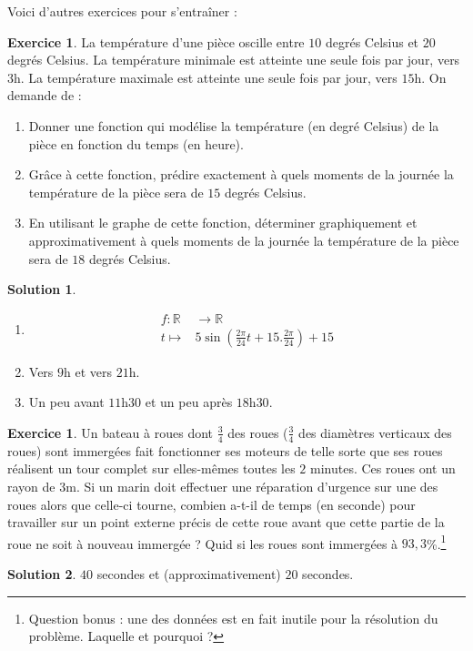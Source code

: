 \documentclass[a4paper,fontsize=13pt]{scrreprt}
\theoremstyle{plain}
\theoremstyle{definition}
\newtheorem{exo}[subsection]{Exercice}
\newtheorem*{solu}{Solution}
\newcommand{\rr}{\mathbb{R}}
\begin{document}
Voici d'autres exercices pour s'entraîner :

\begin{exo}
La température d'une pièce oscille entre $10$ degrés Celsius et $20$ degrés Celsius. La température minimale est atteinte une seule fois par jour, vers $3$h. La température maximale est atteinte une seule fois par jour, vers $15$h. On demande de :
\begin{enumerate}
\item Donner une fonction qui modélise la température (en degré Celsius) de la pièce en fonction du temps (en heure).
\item Grâce à cette fonction, prédire exactement à quels moments de la journée la température de la pièce sera de $15$ degrés Celsius.
\item En utilisant le graphe de cette fonction, déterminer graphiquement et approximativement à quels moments de la journée la température de la pièce sera de $18$ degrés Celsius.
\end{enumerate}
\end{exo}
\begin{solu}
\begin{enumerate}
\item 
\begin{align*}
		f : \rr &\to \rr \\
		t \mapsto& 5 \sin(\frac{2\pi}{24} t+15.\frac{2\pi}{24}) +15
		\end{align*}
\item Vers $9$h et vers $21$h.
\item Un peu avant $11$h$30$ et un peu après $18$h$30$.
\end{enumerate}
\end{solu}

\begin{exo}
Un bateau à roues dont $\frac{3}{4}$ des roues ($\frac{3}{4}$ des diamètres verticaux des roues) sont immergées fait fonctionner ses moteurs de telle sorte que ses roues réalisent un tour complet sur elles-mêmes toutes les $2$ minutes. Ces roues ont un rayon de $3$m. Si un marin doit effectuer une réparation d'urgence sur une des roues alors que celle-ci tourne, combien a-t-il de temps (en seconde) pour travailler sur un point externe précis de cette roue avant que cette partie de la roue ne soit à nouveau immergée ? Quid si les roues sont immergées à $93,3$\%.\footnote{Question bonus : une des données est en fait inutile pour la résolution du problème. Laquelle et pourquoi ?}
\end{exo}
\begin{solu}
$40$ secondes et (approximativement) $20$ secondes.
\end{solu}
\end{document}
